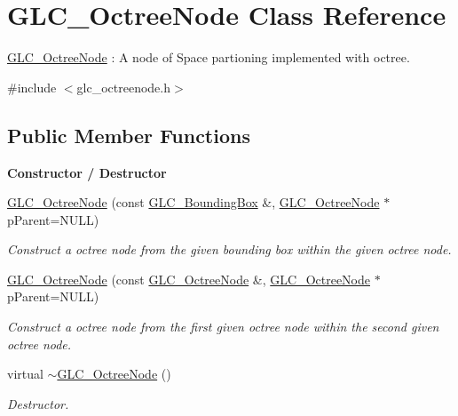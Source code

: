 \hypertarget{class_g_l_c___octree_node}{\section{G\-L\-C\-\_\-\-Octree\-Node Class Reference}
\label{class_g_l_c___octree_node}
}


\hyperlink{class_g_l_c___octree_node}{G\-L\-C\-\_\-\-Octree\-Node} \-: A node of Space partioning implemented with octree.  




{\ttfamily \#include $<$glc\-\_\-octreenode.\-h$>$}

\subsection*{Public Member Functions}
\begin{Indent}{\bf Constructor / Destructor}\par
\begin{DoxyCompactItemize}
\item 
\hyperlink{class_g_l_c___octree_node_aa67e04c5249655480c9df0788bbfbeb4}{G\-L\-C\-\_\-\-Octree\-Node} (const \hyperlink{class_g_l_c___bounding_box}{G\-L\-C\-\_\-\-Bounding\-Box} \&, \hyperlink{class_g_l_c___octree_node}{G\-L\-C\-\_\-\-Octree\-Node} $\ast$p\-Parent=N\-U\-L\-L)
\begin{DoxyCompactList}\small\item\em Construct a octree node from the given bounding box within the given octree node. \end{DoxyCompactList}\item 
\hyperlink{class_g_l_c___octree_node_aaba3713c1656d68bfed74661b73b7ff5}{G\-L\-C\-\_\-\-Octree\-Node} (const \hyperlink{class_g_l_c___octree_node}{G\-L\-C\-\_\-\-Octree\-Node} \&, \hyperlink{class_g_l_c___octree_node}{G\-L\-C\-\_\-\-Octree\-Node} $\ast$p\-Parent=N\-U\-L\-L)
\begin{DoxyCompactList}\small\item\em Construct a octree node from the first given octree node within the second given octree node. \end{DoxyCompactList}\item 
virtual \hyperlink{class_g_l_c___octree_node_ad390719454feccb9568e8a4a3591fa40}{$\sim$\-G\-L\-C\-\_\-\-Octree\-Node} ()
\begin{DoxyCompactList}\small\item\em Destructor. \end{DoxyCompactList}\end{DoxyCompactItemize}
\end{Indent}
